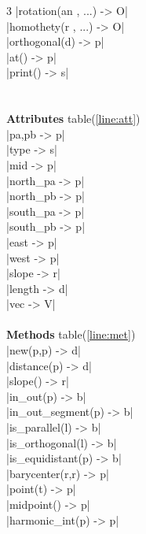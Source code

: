 \documentclass[DIV         = 14,
               fontsize    = 10,
               index       = totoc,
               twoside,
               cadre,
               headings    = small
               ]{tkz-doc}
\begin{document}
\begin{multicols}{3}
|rotation(an , ...)        -> O|   \\
|homothety(r , ...)        -> O|   \\
|orthogonal(d)             -> p|   \\
|at()                      -> p|   \\
|print()                   -> s|   \\
                                   \\
               \\
\textbf{Attributes} table(\ref{line:att})  \\
|pa,pb                     -> p|   \\
|type                      -> s|   \\
|mid                       -> p|   \\
|north_pa                  -> p|   \\
|north_pb                  -> p|   \\
|south_pa                  -> p|   \\
|south_pb                  -> p|   \\
|east                      -> p|   \\
|west                      -> p|   \\
|slope                     -> r|   \\
|length                    -> d|   \\
|vec                       -> V|   \\
\\
\textbf{Methods} table(\ref{line:met})     \\
|new(p,p)                  -> d|   \\
|distance(p)               -> d|   \\
|slope()                   -> r|   \\
|in_out(p)                 -> b|   \\
|in_out_segment(p)         -> b|   \\
|is_parallel(l)            -> b|   \\
|is_orthogonal(l)          -> b|   \\
|is_equidistant(p)         -> b|   \\
|barycenter(r,r)           -> p|   \\
|point(t)                  -> p|   \\
|midpoint()                -> p|   \\
|harmonic_int(p)           -> p|   \\

\end{multicols}
\end{document}
